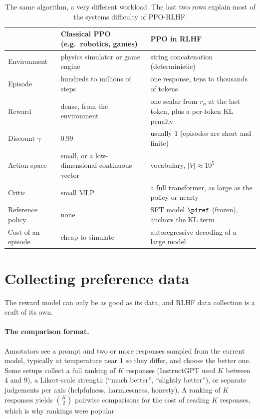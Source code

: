 \begin{table}[h]
\centering\small
\begin{tabularx}{\linewidth}{@{}lXX@{}}
\toprule
& \textbf{Classical PPO (e.g.\ robotics, games)} & \textbf{PPO in RLHF}\\
\midrule
Environment & physics simulator or game engine & string concatenation (deterministic)\\
Episode & hundreds to millions of steps & one response, tens to thousands of tokens\\
Reward & dense, from the environment & one scalar from $r_\phi$ at the last token, plus a per-token KL penalty\\
Discount $\gamma$ & $0.99$ & usually $1$ (episodes are short and finite)\\
Action space & small, or a low-dimensional continuous vector & vocabulary, $|V|\approx 10^5$\\
Critic & small MLP & a full transformer, as large as the policy or nearly\\
Reference policy & none & SFT model $\piref$ (frozen), anchors the KL term\\
Cost of an episode & cheap to simulate & autoregressive decoding of a large model\\
\bottomrule
\end{tabularx}
\caption{The same algorithm, a very different workload. The last two rows explain most of the
systems difficulty of PPO-RLHF.}
\label{tab:rlhf:mapping}
\end{table}

\section{Collecting preference data}\label{sec:rlhf:data}

The reward model can only be as good as its data, and RLHF data collection is a craft of its own.

\paragraph{The comparison format.} Annotators see a prompt and two or more responses sampled from
the current model, typically at temperature near 1 so they differ, and choose the better one. Some setups
collect a full ranking of $K$ responses (InstructGPT used $K$ between 4 and 9), a Likert-scale
strength (``much better'', ``slightly better''), or separate judgements per axis (helpfulness,
harmlessness, honesty). A ranking of $K$ responses yields $\binom{K}{2}$ pairwise comparisons for
the cost of reading $K$ responses, which is why rankings were popular.

